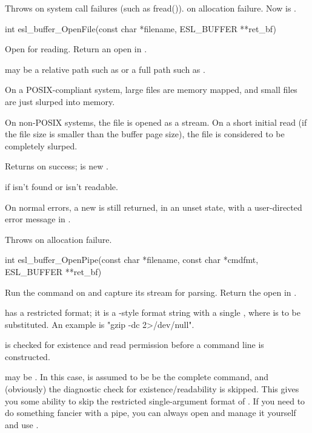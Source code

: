 \begin{sreapi}
Throws  on system call failures (such as fread()).
 on allocation failure.
Now  is .


\hypertarget{func:esl_buffer_OpenFile()}
{\item[int esl\_buffer\_OpenFile(const char *filename, ESL\_BUFFER **ret\_bf)]}

Open  for reading. Return an open  in
.

 may be a relative path such as 
or a full path such as .

On a POSIX-compliant system, large files are memory 
mapped, and small files are just slurped into memory.

On non-POSIX systems, the file is opened as a stream.
On a short initial read (if the file size is smaller than
the buffer page size), the file is considered to be
completely slurped.

Returns  on success;  is new .

 if  isn't found or isn't readable.

On normal errors, a new  is still returned, in
an unset state, with a user-directed error message in
.

Throws  on allocation failure.


\hypertarget{func:esl_buffer_OpenPipe()}
{\item[int esl\_buffer\_OpenPipe(const char *filename, const char *cmdfmt, ESL\_BUFFER **ret\_bf)]}

Run the command  on  and capture its 
stream for parsing. Return the open  in
.

 has a restricted format; it is a -style
format string with a single , where  is to
be substituted. An example  is "gzip -dc %
2>/dev/null".

 is checked for existence and read permission
before a command line is constructed.

 may be . In this case,  is
assumed to be be the complete command, and (obviously)
the diagnostic check for 
existence/readability is skipped. This gives you some
ability to skip the restricted single-argument format of
.  If you need to do something fancier with a
pipe, you can always open and manage it yourself and use
.


\end{sreapi}
